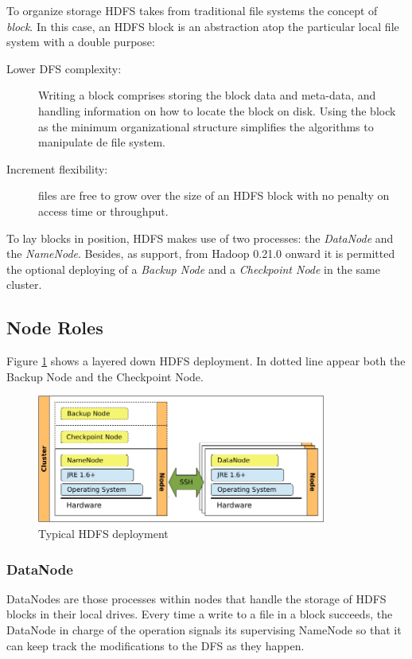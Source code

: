 To organize storage HDFS takes from traditional file systems the concept of \emph{block}. In this case, an HDFS block is an abstraction atop the particular local file system with a double purpose:

\begin{description}
 \item[Lower DFS complexity:] Writing a block comprises storing the block data and meta-data, and handling information on how to locate the block on disk. Using the block as the minimum organizational structure simplifies the algorithms to manipulate de file system.
 \item[Increment flexibility:] files are free to grow over the size of an HDFS block with no penalty on access time or throughput.
\end{description}

To lay blocks in position, HDFS makes use of two processes: the \emph{DataNode} and the \emph{NameNode}. Besides, as support, from Hadoop 0.21.0 onward it is permitted the optional deploying of a \emph{Backup Node} and a \emph{Checkpoint Node} in the same cluster.

\subsection{Node Roles}\label{subsec:rolesnodos}
\noindent Figure \ref{fig:desplieguehdfs} shows a layered down HDFS deployment. In dotted line appear both the Backup Node and the Checkpoint Node.

\begin{figure}[tbp]
\begin{center}
\includegraphics[width=0.85\textwidth]{imagenes/017.pdf}
 \caption{Typical HDFS deployment}
\label{fig:desplieguehdfs}
\end{center}
\end{figure}

\subsubsection{DataNode}\label{subsubsec:datanode}
\noindent DataNodes are those processes within nodes that handle the storage of HDFS blocks in their local drives. Every time a write to a file in a block succeeds, the DataNode in charge of the operation signals its supervising NameNode so that it can keep track the modifications to the DFS as they happen.

